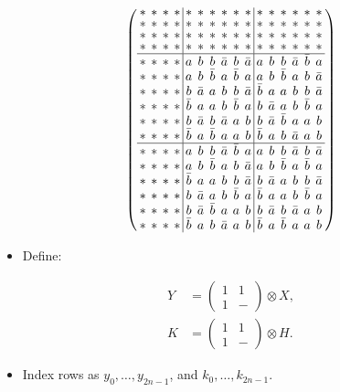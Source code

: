 \documentclass{beamer}
\begin{document}
\begin{frame}
  
  \[
    \arraycolsep=2.0pt\def\arraystretch{0.75}
    \left(
      \begin{array}{cccc|cccccc|cccccc}
        *&*&*&*&*&*&*&*&*&*&*&*&*&*&*&*\\
        *&*&*&*&*&*&*&*&*&*&*&*&*&*&*&*\\
        *&*&*&*&*&*&*&*&*&*&*&*&*&*&*&*\\
        *&*&*&*&*&*&*&*&*&*&*&*&*&*&*&*\\ \hline
        *&*&*&*&a&b&b&\bar{a}&b&\bar{a}&a&b&b&\bar{a}&\bar{b}&a\\
        *&*&*&*&a&b&\bar{b}&a&\bar{b}&a&a&b&\bar{b}&a&b&\bar{a}\\
        *&*&*&*&b&\bar{a}&a&b&b&\bar{a}&\bar{b}&a&a&b&b&\bar{a}\\
        *&*&*&*&\bar{b}&a&a&b&\bar{b}&a&b&\bar{a}&a&b&\bar{b}&a\\
        *&*&*&*&b&\bar{a}&b&\bar{a}&a&b&b&\bar{a}&\bar{b}&a&a&b\\
        *&*&*&*&\bar{b}&a&\bar{b}&a&a&b&\bar{b}&a&b&\bar{a}&a&b\\ \hline
        *&*&*&*&a&b&b&\bar{a}&\bar{b}&a&a&b&b&\bar{a}&b&\bar{a}\\
        *&*&*&*&a&b&\bar{b}&a&b&\bar{a}&a&b&\bar{b}&a&\bar{b}&a\\
        *&*&*&*&\bar{b}&a&a&b&b&\bar{a}&b&\bar{a}&a&b&b&\bar{a}\\
        *&*&*&*&b&\bar{a}&a&b&\bar{b}&a&\bar{b}&a&a&b&\bar{b}&a\\
        *&*&*&*&b&\bar{a}&\bar{b}&a&a&b&b&\bar{a}&b&\bar{a}&a&b\\
        *&*&*&*&\bar{b}&a&b&\bar{a}&a&b&\bar{b}&a&\bar{b}&a&a&b\\
      \end{array}
    \right)
  \]

\end{frame}

\begin{frame}

  \begin{itemize}
    \item Define:
  \end{itemize}

  \begin{align*}
    Y &= \left( \begin{smallmatrix} 1&1\\1&- \end{smallmatrix} \right) \otimes X,\\
    K &= \left( \begin{smallmatrix} 1&1\\1&- \end{smallmatrix} \right) \otimes H.
  \end{align*}

  \begin{itemize}
    \item Index rows as $y_0, \dots, y_{2n-1}$, and $k_0, \dots, k_{2n-1}$.
  \end{itemize}
  
\end{frame}
\end{document}
